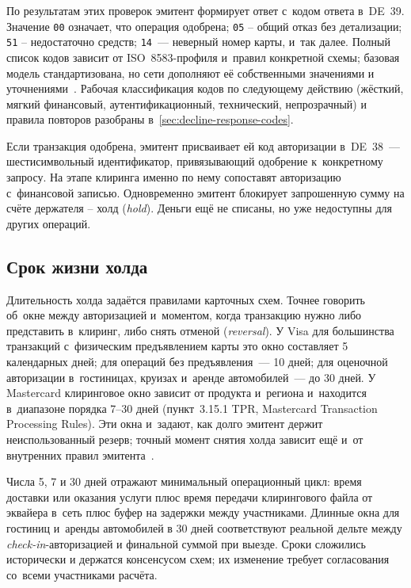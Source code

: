 По результатам этих проверок эмитент формирует ответ с~кодом
ответа в~DE~39. Значение \texttt{00} означает, что операция одобрена;
\texttt{05} -- общий отказ без детализации; \texttt{51} -- недостаточно
средств; \texttt{14}~--- неверный номер карты, и~так далее. Полный
список кодов зависит от ISO~8583-профиля и~правил конкретной схемы;
базовая модель стандартизована, но сети дополняют её собственными
значениями и уточнениями~\cite{iso-8583-2023,visa-tadg,mc-rules}.
Рабочая классификация кодов по следующему действию (жёсткий,
мягкий финансовый, аутентификационный, технический, непрозрачный)
и правила повторов разобраны
в~\ref{sec:decline-response-codes}.

Если транзакция одобрена, эмитент присваивает ей код авторизации
в~DE~38~--- шестисимвольный идентификатор,
привязывающий одобрение к~конкретному запросу. На этапе клиринга
именно по нему сопоставят авторизацию с~финансовой записью.
Одновременно эмитент блокирует запрошенную сумму на счёте
держателя -- холд (\textit{hold}). Деньги ещё не списаны, но уже недоступны для других
операций.

\subsection*{Срок жизни холда}

Длительность холда задаётся правилами карточных схем. Точнее
говорить об~окне между авторизацией и~моментом, когда транзакцию
нужно либо представить в~клиринг, либо снять отменой
(\textit{reversal}). У Visa для большинства транзакций с~физическим
предъявлением карты это окно составляет 5 календарных дней;
для операций без предъявления~--- 10 дней; для оценочной авторизации
в~гостиницах, круизах и~аренде автомобилей~--- до 30 дней.
У Mastercard клиринговое окно зависит от продукта и~региона
и~находится в~диапазоне порядка 7--30 дней
(пункт~3.15.1 TPR, Mastercard Transaction Processing Rules).
Эти окна и~задают, как долго эмитент держит неиспользованный
резерв; точный момент снятия холда зависит ещё и~от внутренних
правил эмитента~\cite{visa-core-rules,mc-tpr}.

Числа 5, 7 и 30 дней отражают минимальный операционный цикл: время
доставки или оказания услуги плюс время передачи клирингового файла
от эквайера в~сеть плюс буфер на задержки между участниками.
Длинные окна для гостиниц и~аренды автомобилей в 30 дней
соответствуют реальной дельте между \textit{check-in}-авторизацией и финальной
суммой при выезде. Сроки сложились исторически и держатся консенсусом
схем; их изменение требует согласования со~всеми участниками расчёта.

